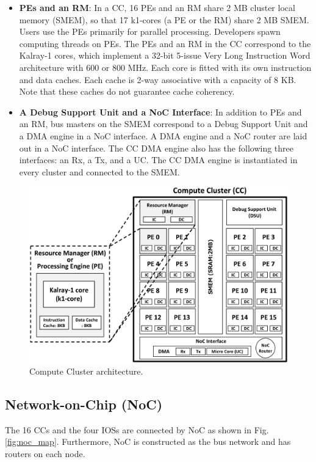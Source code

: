 \begin{itemize}
  \setlength{\leftskip}{-5mm}    
  \item \textbf{PEs and an RM}:
  In a CC, 16 PEs and an RM share 2 MB cluster local memory (SMEM), so that 17 k1-cores (a PE or the RM) share 2 MB SMEM.
  Users use the PEs primarily for parallel processing.
  Developers spawn computing threads on PEs.
  The PEs and an RM in the CC correspond to the Kalray-1 cores, which implement a 32-bit 5-issue Very Long Instruction Word architecture with 600 or 800 MHz.
  Each core is fitted with its own instruction and data caches.
  Each cache is 2-way associative with a capacity of 8 KB.
  Note that these caches do not guarantee cache coherency.
  
  \item \textbf{A Debug Support Unit and a NoC Interface}:
  In addition to PEs and an RM, bus masters on the SMEM correspond to a Debug Support Unit and a DMA engine in a NoC interface.
  A DMA engine and a NoC router are laid out in a NoC interface.
  The CC DMA engine also has the following three interfaces: an Rx, a Tx, and a UC. 
  The CC DMA engine is instantiated in every cluster and connected to the SMEM.
\end{itemize}
\begin{figure}[!htbp]
  \centering
  \includegraphics[width=0.7\linewidth]{../figure/cc_architecture.eps}
  \caption{\label{fig:cc_architecture}
    Compute Cluster architecture.}
\end{figure}

\subsection{Network-on-Chip (NoC)}
\label{sec:noc}
The 16 CCs and the four IOSs are connected by NoC as shown in Fig. \ref{fig:noc_map}.
Furthermore, NoC is constructed  as the bus network and has routers on each node.

